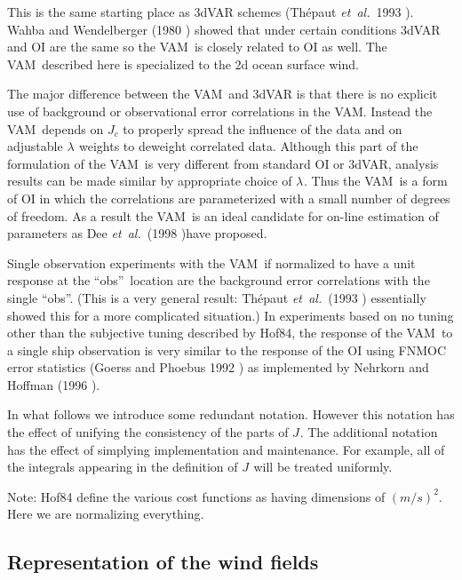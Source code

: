 \documentclass[11pt]{article}
\newcommand{\etal}{{\em et~al.}}
\newcommand{\gl}[1]{\mbox{$ \lambda_{#1} $}}
\newcommand{\J}[1]{\mbox{$ J_{#1} $}}
\newcommand{\obs}{``obs''}
\newcommand{\vam}{VAM}
\newcommand{\xxx}[1]{\subsection {#1}}
\newcommand{\reference}[2]{(#1 \cite{#2})}
\begin{document}
This is the same starting place as 3dVAR schemes
\reference{Th\'{e}paut \etal\ 1993}{TheVC+93}.  Wahba and Wendelberger
\reference{1980}{WahW80} showed that under certain conditions 3dVAR
and OI are the same so the \vam\ is closely related to OI as well.
The \vam\ described here is specialized to the 2d ocean surface wind.

The major difference between the \vam\ and 3dVAR is that there is no
explicit use of background or observational error correlations in the
\vam.  Instead the \vam\ depends on \J{c} to properly spread the
influence of the data and on adjustable \gl{} weights to deweight
correlated data.  Although this part of the formulation of the \vam\
is very different from standard OI or 3dVAR, analysis results can be
made similar by appropriate choice of \gl{}.  Thus the \vam\ is a form
of OI in which the correlations are parameterized with a small number
of degrees of freedom.  As a result the \vam\ is an ideal candidate
for on-line estimation of parameters as Dee \etal\
\reference{1998}{Deed98,DeeGR+99}have proposed.

Single observation experiments with the \vam\ if normalized to have a
unit response at the \obs\ location are the background error
correlations with the single \obs.  (This is a very general result:
Th\'{e}paut \etal\ \reference{1993}{TheHC93} essentially showed this
for a more complicated situation.)  In experiments based on no tuning
other than the subjective tuning described by Hof84, the response of
the \vam\ to a single ship observation is very similar to the response
of the OI using FNMOC error statistics \reference{Goerss and Phoebus
1992}{GoeP92} as implemented by Nehrkorn and Hoffman
\reference{1996}{NehH96}.

In what follows we introduce some redundant notation.  However this
notation has the effect of unifying the consistency of the parts of
\J{}.  The additional notation has the effect of simplying
implementation and maintenance.  For example, all of the integrals
appearing in the definition of \J{} will be treated uniformly.

Note: Hof84 define the various cost functions as having dimensions of
$ (m/s)^2 $.  Here we are normalizing everything.

\xxx {Representation of the wind fields}
\end{document}
